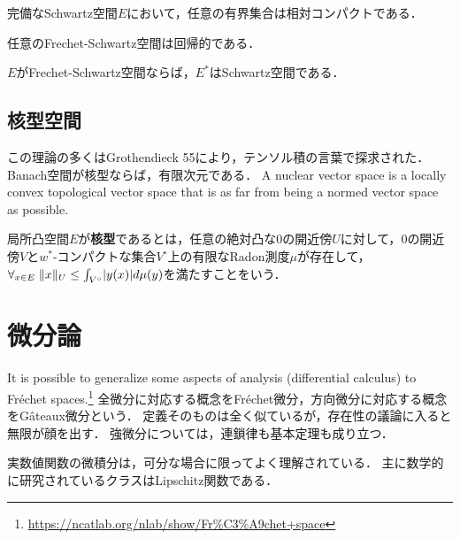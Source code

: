 \documentclass[uplatex,dvipdfmx]{jsreport}
\begin{document}
\begin{lemma}
    完備なSchwartz空間$E$において，任意の有界集合は相対コンパクトである．
\end{lemma}

\begin{theorem}
    任意のFrechet-Schwartz空間は回帰的である．
\end{theorem}

\begin{theorem}
    $E$がFrechet-Schwartz空間ならば，$E^*$はSchwartz空間である．
\end{theorem}

\subsection{核型空間}

\begin{tcolorbox}[colframe=ForestGreen, colback=ForestGreen!10!white,breakable,colbacktitle=ForestGreen!40!white,coltitle=black,fonttitle=\bfseries\sffamily,
title=]
    この理論の多くはGrothendieck 55により，テンソル積の言葉で探求された．
    Banach空間が核型ならば，有限次元である．
    A nuclear vector space is a locally convex topological vector space that is as far from being a normed vector space as possible.
\end{tcolorbox}

\begin{definition}[nuclear]
    局所凸空間$E$が\textbf{核型}であるとは，任意の絶対凸な$0$の開近傍$U$に対して，$0$の開近傍$V$と$w^*$-コンパクトな集合$V^\circ$上の有限なRadon測度$\mu$が存在して，$\forall_{x\in E}\;\|x\|_U\le\int_{V^\circ}\lvert y(x)\rvert d\mu(y)$を満たすことをいう．
\end{definition}

\section{微分論}

\begin{tcolorbox}[colframe=ForestGreen, colback=ForestGreen!10!white,breakable,colbacktitle=ForestGreen!40!white,coltitle=black,fonttitle=\bfseries\sffamily,
title=]
    It is possible to generalize some aspects of analysis (differential calculus) to Fréchet spaces.\footnote{\url{https://ncatlab.org/nlab/show/Fr\%C3\%A9chet+space}}
    全微分に対応する概念をFréchet微分，方向微分に対応する概念をGâteaux微分という．
    定義そのものは全く似ているが，存在性の議論に入ると無限が顔を出す．
    強微分については，連鎖律も基本定理も成り立つ．

    実数値関数の微積分は，可分な場合に限ってよく理解されている．
    主に数学的に研究されているクラスはLipschitz関数である．
\end{tcolorbox}
\end{document}
